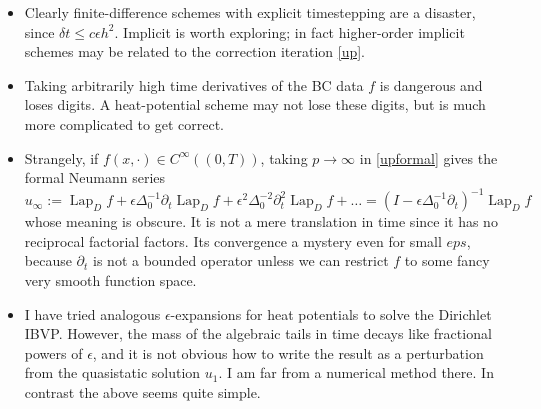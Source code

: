 \documentclass[10pt]{article}
\newcommand{\bi}{\begin{itemize}}
\newcommand{\ei}{\end{itemize}}
\newcommand{\be}{\begin{equation}}
\newcommand{\ee}{\end{equation}}
\newcommand{\eps}{\epsilon}
\newcommand{\dt}{\partial_t}
\DeclareMathOperator{\Lap}{Lap}
\begin{document}
\bi
\item
  Clearly finite-difference schemes with explicit timestepping are
  a disaster, since $\delta t \le c \eps h^2$.
  Implicit is worth exploring; in fact higher-order
  implicit schemes may be related to the correction iteration \eqref{up}.
\item
  Taking arbitrarily high time derivatives of the BC data $f$ is dangerous
  and loses digits. A heat-potential scheme may not lose these digits,
  but is much more complicated to get correct.
\item
Strangely, if $f(x,\cdot) \in C^\infty((0,T))$,
taking $p\to\infty$ in \eqref{upformal} gives the formal Neumann series
\be
u_\infty := \Lap_D f + \eps \Delta_0^{-1} \dt \Lap_D f + \eps^2 \Delta_0^{-2} \dt^2 \Lap_D f + \dots
= (I - \eps \Delta_0^{-1} \dt)^{-1} \Lap_D f
\ee
whose meaning is obscure.
It is not a mere translation in time since it has no
reciprocal factorial factors. Its convergence a mystery
even for small $eps$, because $\dt$ is not a bounded operator
unless we can restrict $f$ to some fancy very smooth function space.
\item
  I have tried analogous $\eps$-expansions for heat potentials
  to solve the Dirichlet IBVP.
  However, the mass of the algebraic tails in time decays like
  fractional powers of $\eps$, and it is not obvious how to
  write the result as a perturbation from the quasistatic solution $u_1$.
  I am far from a numerical method there. In contrast the above seems
  quite simple.
  \ei




\end{document}
